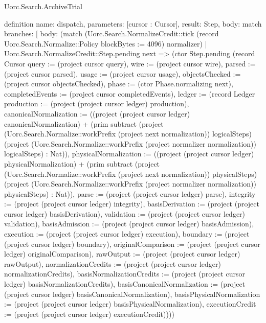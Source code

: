 \begin{lexlean}{Uorc.Search.ArchiveTrial}
\begin{semanticmodule}
definition{
  name: dispatch,
  parameters: [cursor : Cursor],
  result: Step,
  body: match{
    branches: [
      {
        body: (match (Uorc.Search.NormalizeCredit::tick (record Uorc.Search.Normalize::Policy {blockBytes := 4096}) normalizer)
          | Uorc.Search.NormalizeCredit::Step.pending next => (ctor Step.pending (record Cursor {query := (project cursor query), wire := (project cursor wire), parsed := (project cursor parsed), usage := (project cursor usage), objectsChecked := (project cursor objectsChecked), phase := (ctor Phase.normalizing next), completedEvents := (project cursor completedEvents), ledger := (record Ledger {production := (project (project cursor ledger) production), canonicalNormalization := ((project (project cursor ledger) canonicalNormalization) + (prim subtract (project (Uorc.Search.Normalize::workPrefix (project next normalization)) logicalSteps) (project (Uorc.Search.Normalize::workPrefix (project normalizer normalization)) logicalSteps) : Nat)), physicalNormalization := ((project (project cursor ledger) physicalNormalization) + (prim subtract (project (Uorc.Search.Normalize::workPrefix (project next normalization)) physicalSteps) (project (Uorc.Search.Normalize::workPrefix (project normalizer normalization)) physicalSteps) : Nat)), parse := (project (project cursor ledger) parse), integrity := (project (project cursor ledger) integrity), basisDerivation := (project (project cursor ledger) basisDerivation), validation := (project (project cursor ledger) validation), basisAdmission := (project (project cursor ledger) basisAdmission), execution := (project (project cursor ledger) execution), boundary := (project (project cursor ledger) boundary), originalComparison := (project (project cursor ledger) originalComparison), rawOutput := (project (project cursor ledger) rawOutput), normalizationCredits := (project (project cursor ledger) normalizationCredits), basisNormalizationCredits := (project (project cursor ledger) basisNormalizationCredits), basisCanonicalNormalization := (project (project cursor ledger) basisCanonicalNormalization), basisPhysicalNormalization := (project (project cursor ledger) basisPhysicalNormalization), executionCredit := (project (project cursor ledger) executionCredit)})}))
}}}
\end{semanticmodule}
\end{lexlean}
